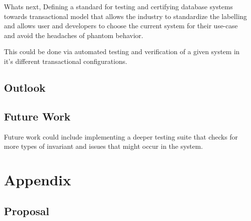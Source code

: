 \documentclass[a4paper,10pt,titlepage]{report}
\begin{document}
     
    Whats next, Defining a standard for testing and certifying database systems towards transactional model that allows the industry to standardize the labelling and allows user and developers to choose the current system for their use-case and avoid the headaches of phantom behavior.

    This could be done via automated testing and verification of a given system in it's different transactional configurations.

    \section*{Outlook}


    \section{Future Work}
    Future work could include implementing a deeper testing suite that checks for more types of invariant and issues that might occur in the system.





    \newpage


    \chapter{Appendix}

    \pagestyle{empty}
    \printbibliography


    \section{Proposal}
    



\end{document}
